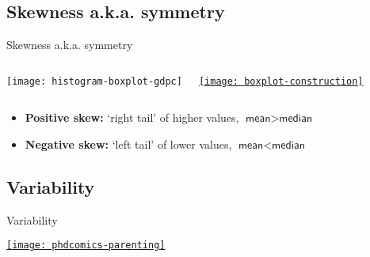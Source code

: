 \documentclass[t]{beamer}
\begin{document}
	\subsection{Skewness a.k.a. symmetry}

	\begin{frame}[t]{Skewness a.k.a. symmetry}

		\begin{columns}[c]
			\texttt{[image: histogram-boxplot-gdpc]}
			
			\href{http://vita.had.co.nz/papers/boxplots.html}%
				{\texttt{[image: boxplot-construction]}}
		\end{columns}
		
		\vspace{1em}
		
		\begin{itemize}
			\item \textbf{Positive skew:} %
				`right tail' of higher values, $\textsf{mean} > \textsf{median}$
			\item \textbf{Negative skew:} %
				`left tail' of lower values, $\textsf{mean} < \textsf{median}$
		\end{itemize}
		
	\end{frame}
	
	\subsection{Variability}
	
  
  \begin{frame}[c]{Variability}

		\begin{center}
			\href{http://www.phdcomics.com/comics.php?f=1563}{\texttt{[image: phdcomics-parenting]}}
    \end{center}
		  
  \end{frame}
	
\end{document}
